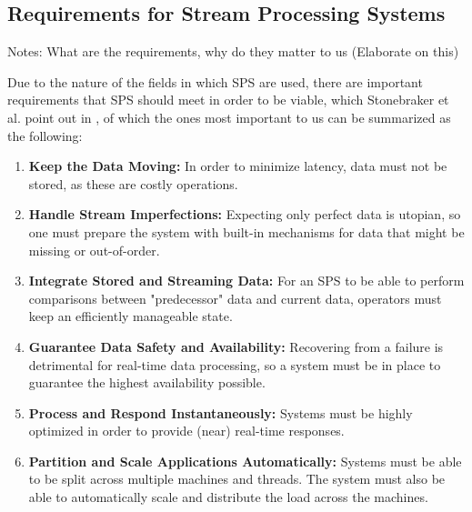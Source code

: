         \subsection{Requirements for Stream Processing Systems}
        \label{sub:requirements}

        Notes: What are the requirements, why do they matter to us (Elaborate on this)

        Due to the nature of the fields in which SPS are used, there are important requirements that SPS should meet in order to be viable, 
        which Stonebraker et al. point out in \cite{Stonebraker:2005:RRS:1107499.1107504}, of which the ones most important to us can be summarized as the following:
        
        \begin{enumerate}
        \label{enum:requirements}
            \item \textbf{Keep the Data Moving:} 
                In order to minimize latency, data must not be stored, as these are costly operations.
            \item \textbf{Handle Stream Imperfections:} 
                Expecting only perfect data is utopian, so one must prepare the system with built-in mechanisms for data that might be missing or out-of-order.
            \item \textbf{Integrate Stored and Streaming Data:} 
                For an SPS to be able to perform comparisons between "predecessor" data and current data, operators must keep an efficiently manageable state.
            \item \textbf{Guarantee Data Safety and Availability:} 
                Recovering from a failure is detrimental for real-time data processing, so a system must be in place to guarantee the highest availability possible.
            \item \textbf{Process and Respond Instantaneously:} 
                Systems must be highly optimized in order to provide (near) real-time responses.
            \item \textbf{Partition and Scale Applications Automatically:} 
                Systems must be able to be split across multiple machines and threads.
                The system must also be able to automatically scale and distribute the load across the machines.

        \end{enumerate}

